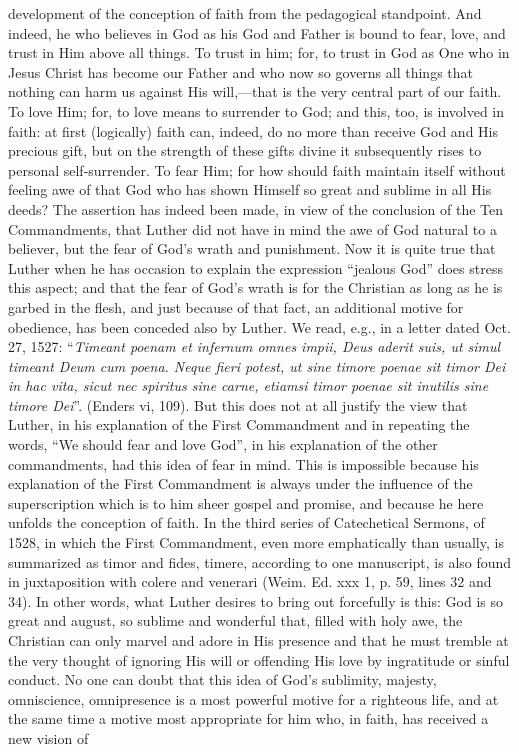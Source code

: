 development of the conception of faith from the pedagogical standpoint. And indeed, he who believes in God as his God and Father is bound to fear, love, and trust in Him above all things. To trust in
him; for, to trust in God as One who in Jesus Christ has become our Father and who now so governs all things that nothing can harm us against His will,—that is the very central part of our faith. To love Him; for, to love means to surrender to God; and this, too, is involved in faith: at first (logically) faith can, indeed, do no more than receive God and His precious gift, but on the strength of these gifts divine it subsequently rises to personal self-surrender. To fear Him; for how should faith maintain itself without feeling awe of that God who has shown Himself so great and sublime in all His deeds? The assertion has indeed been made, in view of the conclusion of the Ten Commandments, that Luther did not have in mind the awe of God natural to a believer, but the fear of God's wrath and punishment. Now it is quite true that Luther when he has occasion to explain the expression “jealous God” does stress this aspect; and that the fear of God's wrath is for the Christian as long as he is garbed in the flesh, and just because of that fact, an additional motive for obedience, has been conceded also by Luther. We read, e.g., in a letter dated Oct. 27, 1527: “\emph{Timeant poenam et infernum omnes impii, Deus aderit suis, ut simul timeant Deum cum poena. Neque fieri potest, ut sine timore poenae sit timor Dei in hac vita, sicut nec spiritus sine carne, etiamsi timor poenae sit inutilis sine timore Dei}”. (Enders vi, 109). But this does not at all justify the view that Luther, in his explanation of the First Commandment and in repeating the words, “We should fear and love God”, in his explanation of the other commandments, had this idea of fear in mind. This is impossible because his explanation of the First Commandment is always under the influence of the superscription which is to him sheer gospel and promise, and because he here unfolds the conception of faith. In the third series of Catechetical Sermons, of 1528, in which the First Commandment, even more emphatically than usually, is summarized as timor and fides, timere, according to one manuscript, is also found in juxtaposition with colere and venerari (Weim. Ed. xxx 1, p. 59, lines 32 and 34). In other words, what Luther desires to bring out forcefully is this: God is so great and august, so sublime and wonderful that, filled with holy awe, the Christian can only marvel and adore in His presence and that he must tremble at the very thought of ignoring His will or offending His love by ingratitude or sinful conduct. No one can doubt that this idea of God's sublimity, majesty, omniscience, omnipresence is a most powerful motive for a righteous life, and at the same time a motive most appropriate for him who, in faith, has received a new vision of

